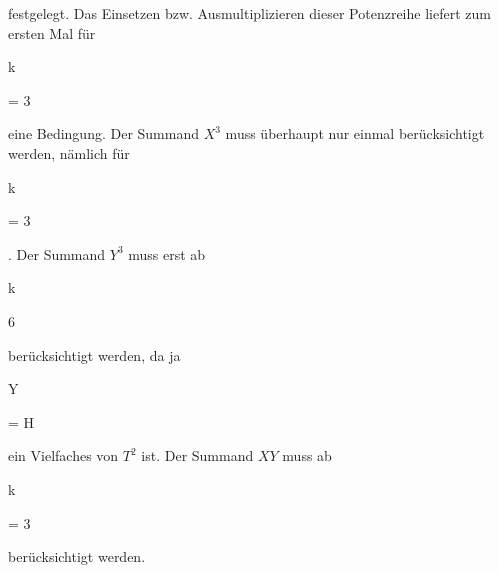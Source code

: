 {{{ } {
}

{ } {
}

}
{}
{}{}
festgelegt. Das Einsetzen bzw. Ausmultiplizieren dieser Potenzreihe liefert zum ersten Mal für


\mavergleichskette

{\vergleichskette

{k
}

{ = }{ 3
}

{  }{
}

{    }{
}

{   }{
}

}
{}{}{}
eine Bedingung. Der Summand $X^3$
 {} {}
muss überhaupt nur einmal berücksichtigt werden, nämlich für


\mavergleichskette

{\vergleichskette

{k
}

{ = }{ 3
}

{  }{
}

{    }{
}

{   }{
}

}
{}{}{.}
Der Summand $Y^3$ muss erst ab


\mavergleichskette

{\vergleichskette

{k
}

{ \geq }{ 6
}

{  }{
}

{    }{
}

{   }{
}

}
{}{}{}
berücksichtigt werden, da ja


\mavergleichskette

{\vergleichskette

{Y
}

{ = }{ H
}

{  }{
}

{    }{
}

{   }{
}

}
{}{}{}
ein Vielfaches von $T^2$ ist. Der Summand $XY$ muss ab


\mavergleichskette

{\vergleichskette

{k
}

{ = }{ 3
}

{  }{
}

{    }{
}

{   }{
}

}
{}{}{}
berücksichtigt werden.


}
